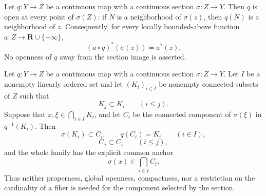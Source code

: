 
\begin{lemma}
\label{lem:p031-continuous-section-pointwise-openness}
Let $q:Y\to Z$ be a continuous map with a continuous section
$\sigma:Z\to Y$.  Then $q$ is open at every point of $\sigma(Z)$: if $N$
is a neighborhood of $\sigma(z)$, then $q(N)$ is a neighborhood of $z$.
Consequently, for every locally bounded-above function
$a:Z\to\mathbf R\cup\{-\infty\}$,
\begin{equation}
\label{eq:p031-continuous-section-usc-regularization}
                  (a\circ q)^*(\sigma(z))=a^*(z).
\end{equation}
No openness of $q$ away from the section image is asserted.
\end{lemma}

\begin{theorem}
\label{thm:p031-continuous-section-persistent-component-anchor}
Let $q:Y\to Z$ be a continuous map with a continuous section
$\sigma:Z\to Y$.  Let $I$ be a nonempty linearly ordered set and let
$(K_i)_{i\in I}$ be nonempty connected subsets of $Z$ such that
\[
                    K_j\subset K_i\qquad(i\leq j).
\]
Suppose that $x,\xi\in\bigcap_{i\in I}K_i$, and let $C_i$ be the connected
component of $\sigma(\xi)$ in $q^{-1}(K_i)$.  Then
\begin{equation}
\label{eq:p031-continuous-section-component-surjectivity}
       \sigma(K_i)\subset C_i,
       \qquad q(C_i)=K_i
       \qquad(i\in I),
\end{equation}
\begin{equation}
\label{eq:p031-continuous-section-component-nesting}
                    C_j\subset C_i\qquad(i\leq j),
\end{equation}
and the whole family has the explicit common anchor
\begin{equation}
\label{eq:p031-continuous-section-persistent-anchor}
                       \sigma(x)\in\bigcap_{i\in I}C_i.
\end{equation}
Thus neither properness, global openness, compactness, nor a restriction on
the cardinality of a fiber is needed for the component selected by the
section.
\end{theorem}


